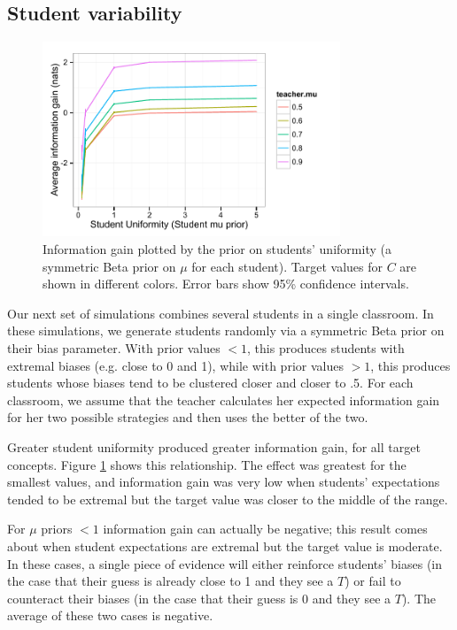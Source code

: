 \documentclass[10pt,letterpaper]{article}
\begin{document}
\subsection{Student variability}

\begin{figure}[t]
\begin{center}
\includegraphics[width=3.5in]{figures/student_uniformity.pdf}
\end{center}
\caption{\label{fig:uniformity} Information gain plotted by the prior on students' uniformity (a symmetric Beta prior on $\mu$ for each student). Target values for $C$ are shown in different colors. Error bars show 95\% confidence intervals.}
\end{figure}

Our next set of simulations combines several students in a single classroom. In these simulations, we generate students randomly via a symmetric Beta prior on their bias parameter. With prior values $< 1$, this produces students with extremal biases (e.g. close to 0 and 1), while with prior values $>1$, this produces students whose biases tend to be clustered closer and closer to .5. For each classroom, we assume that the teacher calculates her expected information gain for her two possible strategies and then uses the better of the two. 

Greater student uniformity produced greater information gain, for all target concepts. Figure \ref{fig:uniformity} shows this relationship. The effect was greatest for the smallest values, and information gain was very low when students' expectations tended to be extremal but the target value was closer to the middle of the range. 

For $\mu$ priors $< 1$ information gain can actually be negative; this result comes about when student expectations are extremal but the target value is moderate. In these cases, a single piece of evidence will either reinforce students' biases (in the case that their guess is already close to 1 and they see a $T$) or fail to counteract their biases (in the case that their guess is 0 and they see a $T$). The average of these two cases is negative.
\end{document}
